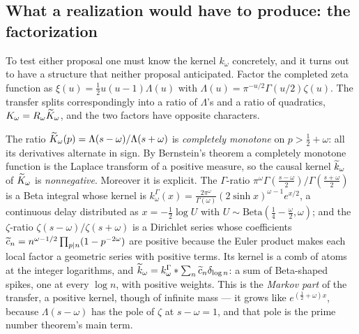 \subsection{What a realization would have to produce: the factorization}

To test either proposal one must know the kernel $k_\omega$ concretely, and it
turns out to have a structure that neither proposal anticipated. Factor the
completed zeta function as $\xi(u)=\frac12u(u-1)\Lambda(u)$ with
$\Lambda(u)=\pi^{-u/2}\Gamma(u/2)\zeta(u)$. The transfer splits
correspondingly into a ratio of $\Lambda$'s and a ratio of quadratics,
$K_\omega=R_\omega\widetilde K_\omega$, and the two factors have opposite characters.

The ratio $\widetilde K_\omega(p)=\Lambda(s-\omega)/\Lambda(s+\omega)$ is
\emph{completely monotone} on $p>\frac12+\omega$: all its derivatives alternate
in sign. By Bernstein's theorem a completely monotone function is the Laplace
transform of a positive measure, so the causal kernel $\widetilde k_\omega$ of
$\widetilde K_\omega$ is \emph{nonnegative}. Moreover it is explicit. The $\Gamma$-ratio
$\pi^\omega\Gamma(\frac{s-\omega}2)/\Gamma(\frac{s+\omega}2)$ is a Beta integral
whose kernel is
$k^\Gamma_\omega(x)=\frac{2\pi^\omega}{\Gamma(\omega)}(2\sinh x)^{\omega-1}e^{x/2}$,
a continuous delay distributed as $x=-\frac12\log U$ with
$U\sim\mathrm{Beta}(\frac14-\frac\omega2,\omega)$; and the $\zeta$-ratio
$\zeta(s-\omega)/\zeta(s+\omega)$ is a Dirichlet series whose coefficients
$\widetilde c_n=n^{\omega-1/2}\prod_{p\mid n}(1-p^{-2\omega})$ are positive because the
Euler product makes each local factor a geometric series with positive terms.
Its kernel is a comb of atoms at the integer logarithms, and
$\widetilde k_\omega=k^\Gamma_\omega*\sum_n\widetilde c_n\delta_{\log n}$: a sum of Beta-shaped
spikes, one at every $\log n$, with positive weights. This is the
\emph{Markov part} of the transfer, a positive kernel, though of infinite
mass --- it grows like $e^{(\frac12+\omega)x}$, because $\Lambda(s-\omega)$ has
the pole of $\zeta$ at $s-\omega=1$, and that pole is the prime number theorem's
main term.

